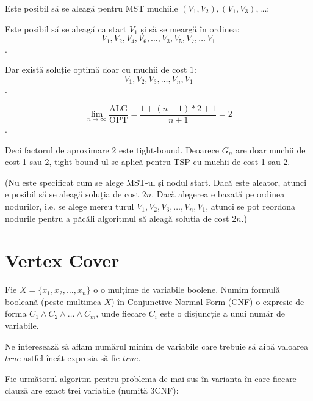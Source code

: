 \documentclass[a4paper,12pt]{article}
\newcommand*{\OPT}{\text{OPT}}
\newcommand*{\ALG}{\text{ALG}}
\begin{document}
\begin{enumerate}
\begin{enumerate}
Este posibil să se aleagă pentru MST muchiile $(V_1, V_2), (V_1, V_3), \dots$:

\begin{center}
\end{center}

Este posibil să se aleagă ca start $V_1$ și să se meargă în ordinea:
\[V_1, V_2, V_4, V_6, \dots, V_3, V_5, V_7, \dots\, V_1\].

Dar există soluție optimă doar cu muchii de cost $1$: \[V_1, V_2, V_3, \dots, V_n, V_1\].

\[\lim_{n \to \infty} \frac{\ALG}{\OPT} = \frac{1 + (n - 1) * 2 + 1}{n + 1} = 2\].

Deci factorul de aproximare 2 este tight-bound.
Deoarece $G_n$ are doar muchii de cost 1 sau 2, tight-bound-ul se aplică pentru
TSP cu muchii de cost 1 sau 2.

(Nu este specificat cum se alege MST-ul și nodul start.
Dacă este aleator, atunci e posibil să se aleagă soluția de cost $2n$.
Dacă alegerea e bazată pe ordinea nodurilor, i.e. se alege mereu turul
$V_1, V_2, V_3, \dots, V_n, V_1$, atunci se pot reordona nodurile pentru
a păcăli algoritmul să aleagă soluția de cost $2n$.)

\end{enumerate}

\end{enumerate}

\section{Vertex Cover}

Fie $X = \{x_1, x_2, \dots, x_n\}$ o o mulțime de variabile boolene. Numim formulă
booleană (peste mulțimea $X$) în Conjunctive Normal Form (CNF) o
expresie de forma $C_1 \land C_2 \land \dots \land C_m$, unde fiecare $C_i$ este
o disjuncție a unui număr de variabile.

Ne interesează să aflăm numărul minim de variabile care trebuie să aibă valoarea
$true$ astfel încât expresia să fie $true$.

Fie următorul algoritm pentru problema de mai sus în varianta în
care fiecare clauză are exact trei variabile (numită 3CNF):
\end{document}
